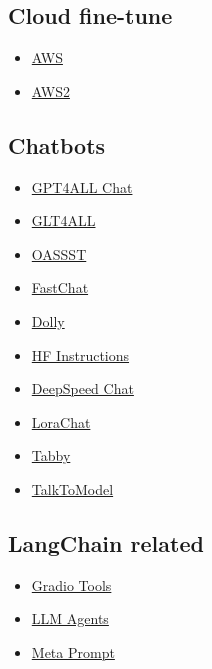 \documentclass{article}
\begin{document}
\subsection*{Cloud fine-tune}
\begin{itemize}
    \item \href{https://docs.aws.amazon.com/sagemaker/latest/dg/jumpstart-fine-tune.html}{AWS}
    \item \href{https://aws.amazon.com/blogs/machine-learning/training-large-language-models-on-amazon-sagemaker-best-practices/}{AWS2}
\end{itemize}

\subsection*{Chatbots}
\begin{itemize}
    \item \href{https://github.com/nomic-ai/gpt4all-chat}{GPT4ALL Chat}
    \item \href{https://github.com/nomic-ai/gpt4all}{GLT4ALL}
    \item \href{https://open-assistant.io/chat}{OASSST}
    \item \href{https://github.com/lm-sys/FastChat}{FastChat}
    \item \href{https://huggingface.co/spaces/HuggingFaceH4/databricks-dolly}{Dolly}
    \item \href{https://huggingface.co/spaces/HuggingFaceH4/instruction-model-outputs-filtered}{HF Instructions}
    \item \href{https://github.com/microsoft/DeepSpeedExamples/tree/master/applications/DeepSpeed-Chat}{DeepSpeed Chat}
    \item \href{https://github.com/bupticybee/FastLoRAChat}{LoraChat}
    \item \href{https://github.com/TabbyML/tabby}{Tabby}
    \item \href{https://github.com/dylan-slack/TalkToModel}{TalkToModel}
\end{itemize}

\subsection*{LangChain related}
\begin{itemize}
    \item \href{https://github.com/freddyaboulton/gradio-tools}{Gradio Tools}
    \item \href{https://blog.langchain.dev/gradio-llm-agents/}{LLM Agents}
    \item \href{https://github.com/mbchang/meta-prompt}{Meta Prompt}
\end{itemize}
\end{document}

